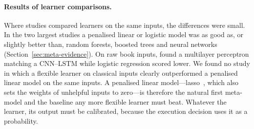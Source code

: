 \paragraph{Results of learner comparisons.} Where studies compared learners on the same inputs, the differences
were small. In the two largest studies a penalised linear or logistic model was as good as, or slightly
better than, random forests, boosted trees and neural networks~\citep{aitsahalia2026,easley2021}
(Section~\ref{sec:meta-evidence}). On raw book inputs,
\citet{briola2020} found a multilayer perceptron matching a CNN--LSTM while logistic regression scored lower. We found no
study in which a flexible learner on classical inputs clearly outperformed a penalised linear model
on the same inputs. A penalised linear model---lasso~\citep{tibshirani1996}, which also sets the weights of
unhelpful inputs to zero---is therefore the natural first meta-model and the baseline any more flexible
learner must beat. Whatever the learner, its output must be calibrated, because the execution decision uses
it as a probability.

